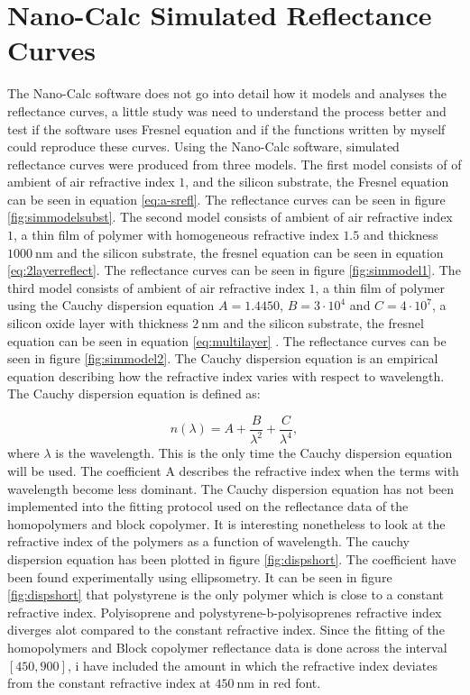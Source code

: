 \documentclass[MasterThesisMain.tex]{subfiles}
\begin{document}
\section{Nano-Calc Simulated Reflectance Curves}
The Nano-Calc software does not go into detail how it models and analyses the reflectance curves, a little study was need to understand the process better and test if the software uses Fresnel equation and if the functions written by myself could reproduce these curves. Using the Nano-Calc software, simulated reflectance curves were produced from three models. The first model consists of of ambient of air refractive index $1$, and the silicon substrate, the Fresnel equation can be seen in equation \ref{eq:a-srefl}. The reflectance curves can be seen in figure \ref{fig:simmodelsubst}. The second model consists of ambient of air refractive index $1$, a thin film of polymer with homogeneous refractive index $1.5$ and thickness $\SI{1000}{\nano\meter}$ and the silicon substrate, the fresnel equation can be seen in equation \ref{eq:2layerreflect}. The reflectance curves can be seen in figure \ref{fig:simmodel1}. The third model consists of ambient of air refractive index $1$, a thin film of polymer using the Cauchy dispersion equation $A=1.4450$, $B=3 \cdot 10^4$ and $C=4 \cdot 10^7$, a silicon oxide layer with thickness $\SI{2}{\nano\meter}$ and the silicon substrate, the fresnel equation can be seen in equation \ref{eq:multilayer} . The reflectance curves can be seen in figure \ref{fig:simmodel2}. The Cauchy dispersion equation is an empirical equation describing how the refractive index varies with respect to wavelength. The Cauchy dispersion equation is defined as:

\begin{equation}
n(\lambda) = A + \frac{B}{\lambda^2} + \frac{C}{\lambda^4},
\end{equation}
where $\lambda$ is the wavelength. This is the only time the Cauchy dispersion equation will be used. The coefficient A describes the refractive index when the terms with wavelength become less dominant. The Cauchy dispersion equation has not been implemented into the fitting protocol used on the reflectance data of the homopolymers and block copolymer. It is interesting nonetheless to look at the refractive index of the polymers as a function of wavelength. The cauchy dispersion equation has been plotted in figure \ref{fig:dispshort}. The coefficient have been found experimentally using ellipsometry. It can be seen in figure \ref{fig:dispshort} that polystyrene is the only polymer which is close to a constant refractive index. Polyisoprene and polystyrene-b-polyisoprenes refractive index diverges alot compared to the constant refractive index. Since the fitting of the homopolymers and Block copolymer reflectance data is done across the interval $[450,900]$, i have included the amount in which the refractive index deviates from the constant refractive index at $\SI{450}{\nano\meter}$ in red font.   
\end{document}
